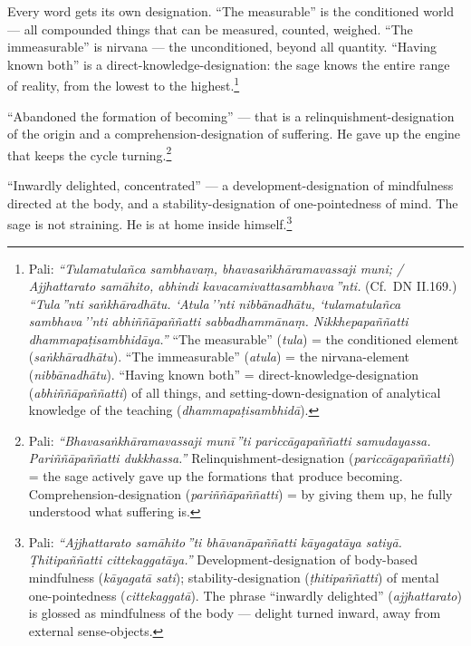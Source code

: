 Every word gets its own designation. ``The measurable'' is the conditioned world --- all compounded things that can be measured, counted, weighed. ``The immeasurable'' is nirvana --- the unconditioned, beyond all quantity. ``Having known both'' is a direct-knowledge-designation: the sage knows the entire range of reality, from the lowest to the highest.\footnote{Pali: \textit{``Tulamatulañca sambhavaṃ, bhavasaṅkhāramavassaji muni; / Ajjhattarato samāhito, abhindi kavacamivattasambhava\,''nti.} (Cf.\ DN II.169.) \textit{``Tula\,''nti saṅkhāradhātu. `Atula\,''nti nibbānadhātu, `tulamatulañca sambhava\,''nti abhiññāpaññatti sabbadhammānaṃ. Nikkhepapaññatti dhammapaṭisambhidāya.''} ``The measurable'' (\textit{tula}) = the conditioned element (\textit{saṅkhāradhātu}). ``The immeasurable'' (\textit{atula}) = the nirvana-element (\textit{nibbānadhātu}). ``Having known both'' = direct-knowledge-designation (\textit{abhiññāpaññatti}) of all things, and setting-down-designation of analytical knowledge of the teaching (\textit{dhammapaṭisambhidā}).}

``Abandoned the formation of becoming'' --- that is a relinquishment-designation of the origin and a comprehension-designation of suffering. He gave up the engine that keeps the cycle turning.\footnote{Pali: \textit{``Bhavasaṅkhāramavassaji munī\,''ti pariccāgapaññatti samudayassa. Pariññāpaññatti dukkhassa.''} Relinquishment-designation (\textit{pariccāgapaññatti}) = the sage actively gave up the formations that produce becoming. Comprehension-designation (\textit{pariññāpaññatti}) = by giving them up, he fully understood what suffering is.}

``Inwardly delighted, concentrated'' --- a development-designation of mindfulness directed at the body, and a stability-designation of one-pointedness of mind. The sage is not straining. He is at home inside himself.\footnote{Pali: \textit{``Ajjhattarato samāhito\,''ti bhāvanāpaññatti kāyagatāya satiyā. Ṭhitipaññatti cittekaggatāya.''} Development-designation of body-based mindfulness (\textit{kāyagatā sati}); stability-designation (\textit{ṭhitipaññatti}) of mental one-pointedness (\textit{cittekaggatā}). The phrase ``inwardly delighted'' (\textit{ajjhattarato}) is glossed as mindfulness of the body --- delight turned inward, away from external sense-objects.}

